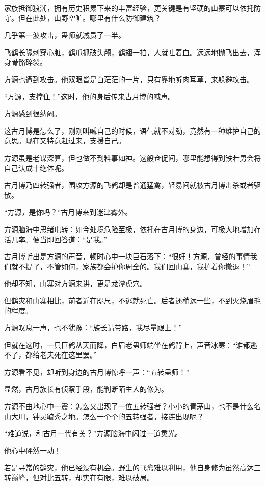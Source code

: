 \begin{this_body}
家族抵御狼潮，拥有历史积累下来的丰富经验，更关键是有坚硬的山寨可以依托防守。但在此处，山野空旷。哪里有什么防御建筑？

几乎第一波攻击，蛊师就减员了一半。

飞鹤长喙刺穿心脏，鹤爪抓破头颅，鹤翅一拍，人就吐着血。远远地抛飞出去，浑身骨骼碎裂。

方源也遭到攻击。他双眼皆是白茫茫的一片，只有靠地听肉耳草，来躲避攻击。

“方源，支撑住！”这时，他的身后传来古月博的喊声。

方源感到很纳闷。

这古月博是怎么了，刚刚叫喊自己的时候，语气就不对劲，竟然有一种维护自己的意思。现在又特意赶过来，支援自己。

方源虽是老谋深算，但也做不到料事如神。这般仓促间，哪里能想得到铁若男会将自己认成十绝体呢。

古月博乃四转强者，围攻方源的飞鹤却是普通猛禽，轻易间就被古月博击杀或者驱散。

“方源，是你吗？”古月博来到迷津雾外。

方源脑海中思绪电转：如今处境危险至极，依托在古月博的身边，可极大地增加存活几率。便当即回答道：“是我。”

古月博听出是方源的声音，顿时心中一块巨石落下：“很好！方源，曾经的事情我们就不提了，不管如何，家族都会护你周全的。我们回山寨，我护着你撤退！”

他却不知，山寨对方源来讲，更是龙潭虎穴。

但鹤灾和山寨相比，前者近在咫尺，不逃就死亡。后者还稍远一些，不到火烧眉毛的程度。

方源叹息一声，也不犹豫：“族长请带路，我尽量跟上！”

但就在这时，一只巨鹤从天而降，白眉老蛊师端坐在鹤背上，声音冰寒：“谁都逃不了，都给老夫死在这里罢。”

方源看不见，却听到身边的古月博惊呼一声：“五转蛊师！”

显然，古月族长有侦察手段，能判断陌生人的修为。

方源不由地心中一震：怎么又出现了一位五转强者？小小的青茅山，也不是什么名山大川，钟灵毓秀之地。怎么一个个的五转强者，接连出现呢？

“难道说，和古月一代有关？”方源脑海中闪过一道灵光。

他心中砰然一动！

若是寻常的鹤灾，他已经没有机会。野生的飞禽难以利用，他自身修为虽然高达三转巅峰，但对比五转，却实在有限，难以破局。


\end{this_body}
